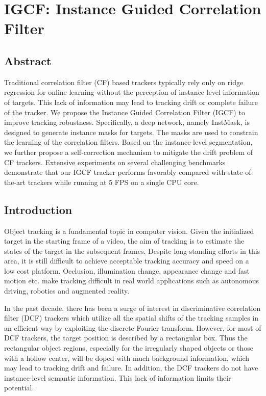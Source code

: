 \chapter{IGCF: Instance Guided Correlation Filter}\label{chap:IGCF}

\section{Abstract}
Traditional correlation filter (CF) based trackers typically rely only on ridge regression for online learning without the perception of instance level information of targets. This lack of information may lead to tracking drift or complete failure of the tracker. We propose the Instance Guided Correlation Filter (IGCF) to improve tracking robustness. Specifically, a deep network, namely InstMask, is designed to generate instance masks for targets. The masks are used to constrain the learning of the correlation filters. Based on the instance-level segmentation, we further propose a self-correction mechanism to mitigate the drift problem of CF trackers. Extensive experiments on several challenging benchmarks demonstrate that our IGCF tracker performs favorably compared with state-of-the-art trackers while running at 5 FPS on a single CPU core.

\section{Introduction}
Object tracking is a fundamental topic in computer vision. Given the initialized target in the starting frame of a video, the aim of tracking is to estimate the states of the target in the subsequent frames. Despite long-standing efforts \cite{Leang2018OnlineFO, Wang2019VisualOT, Zhang2018UsingFL} in this area, it is still difficult to achieve acceptable tracking accuracy and speed on a low cost platform. Occlusion, illumination change, appearance change and fast motion etc. make tracking difficult in real world applications such as autonomous driving, robotics and augmented reality.

In the past decade, there has been a surge of interest in discriminative correlation filter (DCF) trackers \cite{bolme2010visual, Zhang2018VisualTU} which utilize all the spatial shifts of the tracking samples in an efficient way by exploiting the discrete Fourier transform. However, for most of DCF trackers, the target position is described by a rectangular box. Thus the rectangular object regions, especially for the irregularly shaped objects or those with a hollow center, will be doped with much background information, which may lead to tracking drift and failure. In addition, the DCF trackers do not have instance-level semantic information. This lack of information limits their potential.

